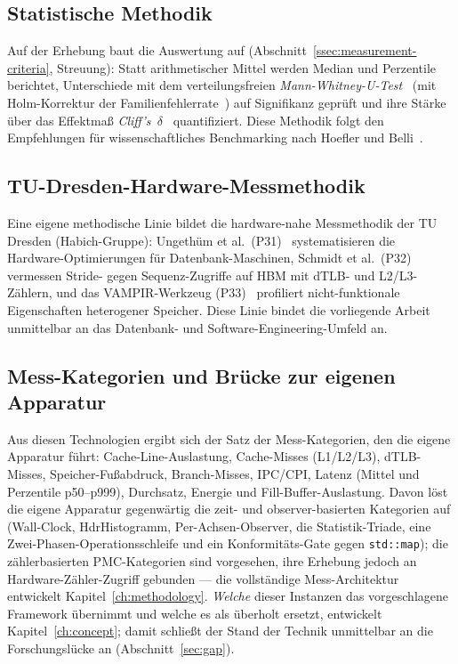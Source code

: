 \subsection{Statistische Methodik}\label{ssec:sota-meas-stats}
Auf der Erhebung baut die Auswertung auf (Abschnitt~\ref{ssec:measurement-criteria}, Streuung):
Statt arithmetischer Mittel werden Median und Perzentile berichtet, Unterschiede mit dem
verteilungsfreien \emph{Mann-Whitney-U-Test}~\cite{mann1947utest} (mit Holm-Korrektur der
Familienfehlerrate~\cite{holm1979sequential}) auf Signifikanz geprüft und ihre Stärke über das
Effektmaß \emph{Cliff's~$\delta$}~\cite{cliff1993dominance} quantifiziert. Diese Methodik folgt den
Empfehlungen für wissenschaftliches Benchmarking nach Hoefler und
Belli~\cite{hoefler2015benchmarking}.

\subsection{TU-Dresden-Hardware-Messmethodik}\label{ssec:sota-meas-tud}
Eine eigene methodische Linie bildet die hardware-nahe Messmethodik der TU Dresden (Habich-Gruppe):
Ungethüm et al.\ (P31)~\cite{ungethuem2017survey} systematisieren die Hardware-Optimierungen für
Datenbank-Maschinen, Schmidt et al.\ (P32)~\cite{schmidt2025hbm} vermessen Stride- gegen
Sequenz-Zugriffe auf HBM mit dTLB- und L2/L3-Zählern, und das VAMPIR-Werkzeug
(P33)~\cite{berthold2023vampir} profiliert nicht-funktionale Eigenschaften heterogener Speicher.
Diese Linie bindet die vorliegende Arbeit unmittelbar an das Datenbank- und
Software-Engineering-Umfeld an.

\subsection{Mess-Kategorien und Brücke zur eigenen Apparatur}\label{ssec:sota-meas-bridge}
Aus diesen Technologien ergibt sich der Satz der Mess-Kategorien, den die eigene Apparatur führt:
Cache-Line-Auslastung, Cache-Misses (L1/L2/L3), dTLB-Misses, Speicher-Fußabdruck, Branch-Misses,
IPC/CPI, Latenz (Mittel und Perzentile p50--p999), Durchsatz, Energie und Fill-Buffer-Auslastung.
Davon löst die eigene Apparatur gegenwärtig die zeit- und observer-basierten Kategorien auf
(Wall-Clock, HdrHistogramm, Per-Achsen-Observer, die Statistik-Triade, eine
Zwei-Phasen-Operationsschleife und ein Konformitäts-Gate gegen \texttt{std::map}); die
zählerbasierten PMC-Kategorien sind vorgesehen, ihre Erhebung jedoch an Hardware-Zähler-Zugriff
gebunden --- die vollständige Mess-Architektur entwickelt Kapitel~\ref{ch:methodology}.
\emph{Welche} dieser Instanzen das vorgeschlagene Framework übernimmt und welche es als überholt
ersetzt, entwickelt Kapitel~\ref{ch:concept}; damit schließt der Stand der Technik unmittelbar an
die Forschungslücke an (Abschnitt~\ref{sec:gap}).

